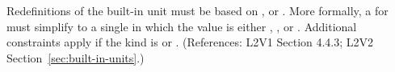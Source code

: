 Redefinitions of the built-in unit  must be based on
,  or .  More formally, a
\UnitDefinition for  must simplify to a single \Unit in which
the   value is either , , or
.  Additional constraints apply if the kind is
 or .  (References: L2V1 Section 4.4.3; L2V2
Section~\ref{sec:built-in-units}.)
